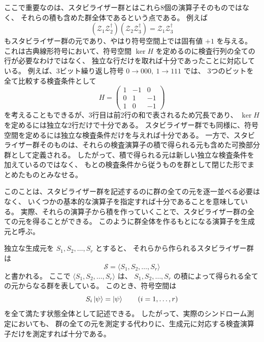 \documentclass[../master.tex]{subfiles}
\begin{document}
ここで重要なのは、スタビライザー群とはこれら8個の演算子そのものではなく、
それらの積も含めた群全体であるという点である。
例えば
\begin{equation}
    (\mathcal{Z}_1\mathcal{Z}_2^\dagger)(\mathcal{Z}_2\mathcal{Z}_3^\dagger)
    =\mathcal{Z}_1\mathcal{Z}_3^\dagger
\end{equation}
もスタビライザー群の元であり、やはり符号空間上では固有値 $+1$ を与える。
これは古典線形符号において、符号空間 $\ker H$ を定めるのに検査行列の全ての行が必要なわけではなく、
独立な行だけを取れば十分であったことに対応している。
例えば、3ビット繰り返し符号 $0\to 000,\ 1\to 111$ では、
3つのビットを全て比較する検査条件として
\begin{equation}
    H=
    \begin{pmatrix}
        1 & -1 & 0\\
        0 & 1 & -1\\
        1 & 0 & -1
    \end{pmatrix}
\end{equation}
を考えることもできるが、3行目は前2行の和で表されるため冗長であり、
$\ker H$ を定めるには独立な2行だけで十分である。
スタビライザー群でも同様に、符号空間を定めるには独立な検査条件だけを与えれば十分である。
一方で、スタビライザー群そのものは、それらの検査演算子の積で得られる元も含めた可換部分群として定義される。
したがって、積で得られる元は新しい独立な検査条件を加えているのではなく、
もとの検査条件から従うものを群として閉じた形でまとめたものとみなせる。

このことは、スタビライザー群を記述するのに群の全ての元を逐一並べる必要はなく、
いくつかの基本的な演算子を指定すれば十分であることを意味している。
実際、それらの演算子から積を作っていくことで、スタビライザー群の全ての元を得ることができる。
このように群全体を作るもとになる演算子を生成元と呼ぶ。

独立な生成元を $S_1,S_2,\dots,S_r$ とすると、
それらから作られるスタビライザー群は
\begin{equation}
    \mathcal{S}=\langle S_1,S_2,\dots,S_r\rangle
\end{equation}
と書かれる。
ここで $\langle S_1,S_2,\dots,S_r\rangle$ は、
$S_1,S_2,\dots,S_r$ の積によって得られる全ての元からなる群を表している。
このとき、符号空間は
\begin{equation}
    S_i\ket{\psi}=\ket{\psi}\qquad (i=1,\dots,r)
\end{equation}
を全て満たす状態全体として記述できる。
したがって、実際のシンドローム測定においても、
群の全ての元を測定する代わりに、生成元に対応する検査演算子だけを測定すれば十分である。
\end{document}
